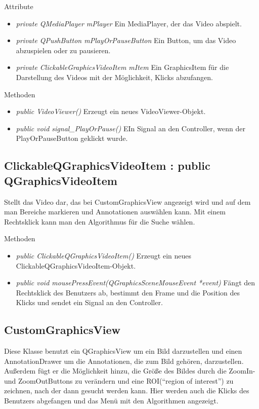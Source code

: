 Attribute
\begin{itemize}
	\item\textit{private QMediaPlayer mPlayer} 
	Ein MediaPlayer, der das Video abspielt. 
	\item\textit{private QPushButton mPlayOrPauseButton} 
	Ein Button, um das Video abzuspielen oder zu pausieren.
	\item\textit{private ClickableGraphicsVideoItem mItem} 
	Ein GraphicsItem für die Darstellung des Videos mit der Möglichkeit, Klicks abzufangen.     
\end{itemize}

Methoden
\begin{itemize}
	\item\textit{public VideoViewer()} 
	Erzeugt ein neues VideoViewer-Objekt.
	\item\textit{public void signal\_PlayOrPause()} 
	EIn Signal an den Controller, wenn der PlayOrPauseButton geklickt wurde.
\end{itemize} 

\subsection*{ClickableQGraphicsVideoItem : public QGraphicsVideoItem}
Stellt das Video dar, das bei CustomGraphicsView angezeigt wird und auf dem man Bereiche markieren und Annotationen auswählen kann. Mit einem Rechtsklick kann man den Algorithmus für die Suche wählen.

Methoden
\begin{itemize}
	\item\textit{public ClickableQGraphicsVideoItem()} 
	Erzeugt ein neues ClickableQGraphicsVideoItem-Objekt.
	\item\textit{public void mousePressEvent(QGraphicsSceneMouseEvent *event)} 
	Fängt den Rechtsklick des Benutzers ab, bestimmt den Frame und die Position des Klicks und sendet ein Signal an den Controller.
\end{itemize}

\subsection*{CustomGraphicsView}
Diese Klasse benutzt ein QGraphicsView um ein Bild darzustellen und einen AnnotationDrawer um die Annotationen, die zum Bild gehören, darzustellen. Außerdem fügt er die Möglichkeit hinzu, die Größe des Bildes durch die ZoomIn- und ZoomOutButtons zu verändern und eine ROI(\enquote{region of interest}) zu zeichnen, nach der dann gesucht werden kann. Hier werden auch die Klicks des Benutzers abgefangen und das Menü mit den Algorithmen angezeigt.

